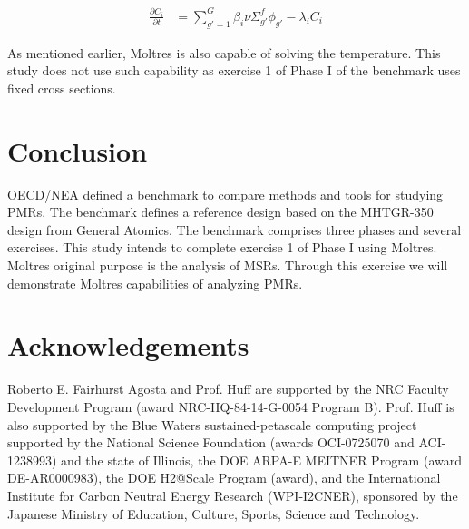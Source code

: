 \documentclass{anstrans}
\begin{document}
\begin{align}
        \frac{\partial C_i}{\partial t} &= \sum_{g'= 1}^G \beta_i \nu
        \Sigma_{g'}^f \phi_{g'} - \lambda_i C_i
\label{eq:precursors}
\end{align}

As mentioned earlier, Moltres is also capable of solving the temperature.
This study does not use such capability as exercise 1 of Phase I of the benchmark uses fixed cross sections.

\section{Conclusion}

OECD/NEA defined a benchmark to compare methods and tools for studying \glspl{PMR}.
The benchmark defines a reference design based on the MHTGR-350 design from General Atomics.
The benchmark comprises three phases and several exercises.
This study intends to complete exercise 1 of Phase I using Moltres.
Moltres original purpose is the analysis of \glspl{MSR}.
Through this exercise we will demonstrate Moltres capabilities of analyzing \glspl{PMR}.

\section{Acknowledgements}

Roberto E. Fairhurst Agosta and Prof. Huff are supported by the \gls{NRC} Faculty Development Program (award NRC-HQ-84-14-G-0054 Program B).
Prof. Huff is also supported by the Blue Waters sustained-petascale computing project supported by the National Science Foundation (awards OCI-0725070 and ACI-1238993) and the state of Illinois, the DOE ARPA-E MEITNER Program (award DE-AR0000983), the DOE H2@Scale Program (award), and the International Institute for Carbon Neutral Energy Research (WPI-I2CNER), sponsored by the Japanese Ministry of Education, Culture, Sports, Science and Technology.



\end{document}
